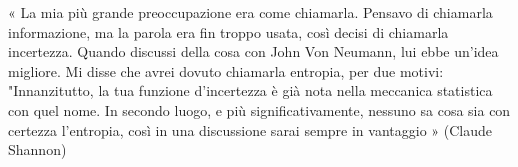 \documentclass[epsfig,a4paper,11pt,titlepage,oneside,openany]{book} %
\theoremstyle{definition}
\numberwithin{equation}{section}
\begin{document}
  
  
  
  
  
  


  \clearpage
 
 
\vspace*{\fill}

 		« La mia più grande preoccupazione era come chiamarla. Pensavo di chiamarla informazione, ma la parola era fin troppo usata, così decisi di chiamarla incertezza. Quando discussi della cosa con John Von Neumann, lui ebbe un'idea migliore. Mi disse che avrei dovuto chiamarla entropia, per due motivi: "Innanzitutto, la tua funzione d'incertezza è già nota nella meccanica statistica con quel nome. In secondo luogo, e più significativamente, nessuno sa cosa sia con certezza l'entropia, così in una discussione sarai sempre in vantaggio » (Claude Shannon) 
\vspace*{\fill}
%

		
	\clearpage
    
	
%  
  \clearpage
  \pagestyle{plain} %

  
  \mainmatter


    \tableofcontents
    \clearpage
    
    
          
\end{document}

